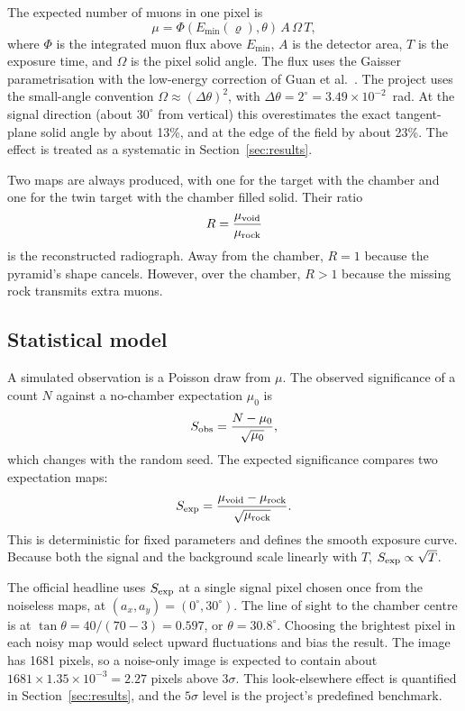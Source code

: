 \documentclass{article}
\begin{document}
The expected number of muons in one pixel is
\begin{equation}
\mu=\Phi(E_{\min}(\varrho),\theta)\,A\,\Omega\,T,
\label{eq:counts}
\end{equation}
where $\Phi$ is the integrated muon flux above $E_{\min}$, $A$ is the detector
area, $T$ is the exposure time, and $\Omega$ is the pixel solid angle. The flux
uses the Gaisser parametrisation \cite{gaisser1990} with the low-energy
correction of Guan et al.\ \cite{guan2015}. The project uses the small-angle
convention $\Omega\approx(\Delta\theta)^2$, with
$\Delta\theta=2^\circ=3.49\times10^{-2}$~rad. At the signal direction (about
$30^\circ$ from vertical) this overestimates the exact tangent-plane solid
angle by about 13\%, and at the edge of the field by about 23\%. The effect is
treated as a systematic in Section~\ref{sec:results}.

Two maps are always produced, with one for the target with the chamber and one for
the twin target with the chamber filled solid. Their ratio
\begin{equation}
R=\frac{\mu_{\rm void}}{\mu_{\rm rock}}
\label{eq:ratio}
\end{equation}
is the reconstructed radiograph. Away from the chamber, $R=1$ because the
pyramid's shape cancels. However, over the chamber, $R>1$ because the missing rock
transmits extra muons.

\subsection{Statistical model}

A simulated observation is a Poisson draw from $\mu$. The observed significance
of a count $N$ against a no-chamber expectation $\mu_0$ is
\begin{equation}
S_{\rm obs}=\frac{N-\mu_0}{\sqrt{\mu_0}},
\label{eq:sobs}
\end{equation}
which changes with the random seed. The expected significance compares two
expectation maps:
\begin{equation}
S_{\rm exp}=\frac{\mu_{\rm void}-\mu_{\rm rock}}{\sqrt{\mu_{\rm rock}}}.
\label{eq:sexp}
\end{equation}
This is deterministic for fixed parameters and defines the smooth exposure
curve. Because both the signal and the background scale linearly with $T$,
$S_{\rm exp}\propto\sqrt{T}$.

The official headline uses $S_{\rm exp}$ at a single signal pixel chosen once
from the noiseless maps, at $(a_x,a_y)=(0^\circ,30^\circ)$. The line of sight
to the chamber centre is at
$\tan\theta=40/(70-3)=0.597$, or $\theta=30.8^\circ$. Choosing the brightest
pixel in each noisy map would select upward fluctuations and bias the result.
The image has 1681 pixels, so a noise-only image is expected to contain about
$1681\times1.35\times10^{-3}=2.27$ pixels above $3\sigma$. This look-elsewhere
effect is quantified in Section~\ref{sec:results}, and the $5\sigma$ level is the
project's predefined benchmark.
\end{document}
